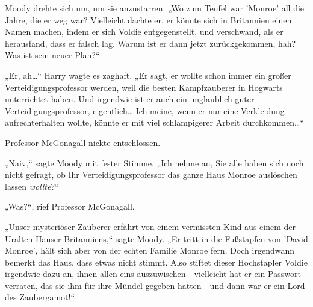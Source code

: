 Moody drehte sich um, um sie anzustarren. „Wo zum Teufel war 'Monroe' all die Jahre, die er weg war? Vielleicht dachte er, er könnte sich in Britannien einen Namen machen, indem er sich Voldie entgegenstellt, und verschwand, als er herausfand, dass er falsch lag. Warum ist er dann jetzt zurückgekommen, hah? Was ist sein neuer Plan?“

„Er, ah…“ Harry wagte es zaghaft. „Er sagt, er wollte schon immer ein großer Verteidigungsprofessor werden, weil die besten Kampfzauberer in Hogwarts unterrichtet haben. Und irgendwie ist er auch ein unglaublich guter Verteidigungsprofessor, eigentlich… Ich meine, wenn er nur eine Verkleidung aufrechterhalten wollte, könnte er mit viel schlampigerer Arbeit durchkommen…“

Professor McGonagall nickte entschlossen.

„Naiv,“ sagte Moody mit fester Stimme. „Ich nehme an, Sie alle haben sich noch nicht gefragt, ob Ihr Verteidigungsprofessor das ganze Haus Monroe auslöschen lassen \emph{wollte}?“

„Was?“, rief Professor McGonagall.

„Unser mysteriöser Zauberer erfährt von einem vermissten Kind aus einem der Uralten Häuser Britanniens,“ sagte Moody. „Er tritt in die Fußstapfen von 'David Monroe', hält sich aber von der echten Familie Monroe fern. Doch irgendwann bemerkt das Haus, dass etwas nicht stimmt. Also stiftet dieser Hochstapler Voldie irgendwie dazu an, ihnen allen eins auszuwischen—vielleicht hat er ein Passwort verraten, das sie ihm für ihre Mündel gegeben hatten—und dann war er ein Lord des Zaubergamot!“

